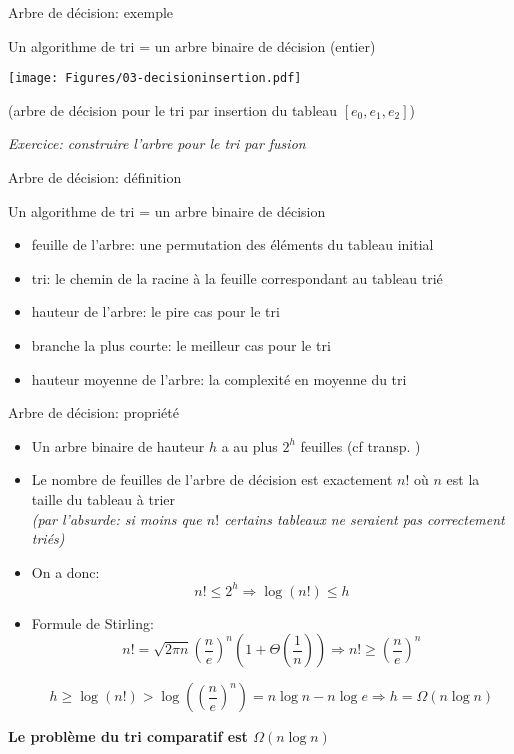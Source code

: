 \begin{frame}{Arbre de décision: exemple}

Un algorithme de tri = un arbre binaire de décision (entier)

\bigskip

\centerline{\texttt{[image: Figures/03-decisioninsertion.pdf]}}

\bigskip

(arbre de décision pour le tri par insertion du tableau $[e_0,e_1,e_2]$)

\bigskip

\emph{Exercice: construire l'arbre pour le tri par fusion}

\end{frame}

\begin{frame}{Arbre de décision: définition}

Un algorithme de tri = un arbre binaire de décision

\begin{itemize}
\item feuille de l'arbre: une permutation des éléments du tableau initial
\item tri: le chemin de la racine à la feuille correspondant au tableau trié
\item hauteur de l'arbre: le pire cas pour le tri
\item branche la plus courte: le meilleur cas pour le tri
\item hauteur moyenne de l'arbre: la complexité en moyenne du tri
\end{itemize}

\end{frame}

\begin{frame}{Arbre de décision: propriété}
\begin{itemize}
\item Un arbre binaire de hauteur $h$ a au plus $2^h$ feuilles (cf transp. \pageref{sec3:proparbres})
\item Le nombre de feuilles de l'arbre de décision est  exactement $n!$ où  $n$ est la taille du tableau à trier\\
\emph{(par l'absurde: si moins que $n!$ certains tableaux ne seraient pas correctement triés)}
% 
\item On a donc:
$$n!\leq 2^h \Rightarrow \log(n!)\leq h$$
\item Formule de Stirling:
$$n!=\sqrt{2\pi n} (\frac{n}{e})^n (1+\Theta(\frac{1}{n}))\Rightarrow n!\geq (\frac{n}{e})^n$$

$$h\geq \log(n!)>\log((\frac{n}{e})^n)=n\log n - n\log e\Rightarrow h=\Omega(n\log n)$$

\end{itemize}
\bigskip

\centerline{\bf Le problème du tri comparatif est $\Omega(n\log n)$}


\end{frame}

